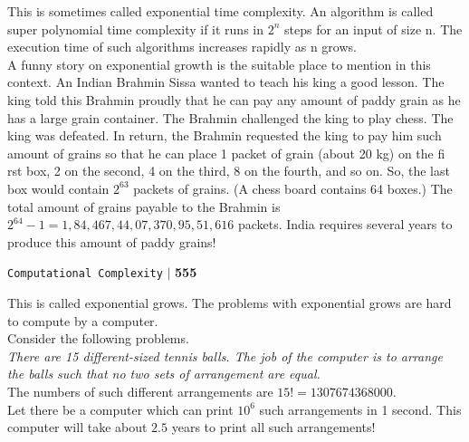 \documentclass[12pt]{article}
\begin{document}
\vspace*{0.2cm}
\small{
This is sometimes called exponential time complexity. An algorithm is called super polynomial time
complexity if it runs in $2^{n}$ steps for an input of size n. The execution time of such algorithms increases
rapidly as n grows.\\
\hspace*{0.5cm} A funny story on exponential growth is the suitable place to mention in this context. An Indian
Brahmin Sissa wanted to teach his king a good lesson. The king told this Brahmin proudly that he can
pay any amount of paddy grain as he has a large grain container. The Brahmin challenged the king to
play chess. The king was defeated. In return, the Brahmin requested the king to pay him such amount of
grains so that he can place 1 packet of grain (about 20 kg) on the fi rst box, 2 on the second, 4 on the third,
8 on the fourth, and so on. So, the last box would contain $2^{63}$ packets of grains. (A chess board contains
64 boxes.) The total amount of grains payable to the Brahmin is $2^{64} - 1 = 1, 84, 467, 44, 07, 370, 95, 51,
616$ packets. India requires several years to produce this amount of paddy grains!\\
}

\newpage
\begin{flushright}
 \texttt{Computational Complexity} \hspace*{0.10cm}\textbf{$|$} \textbf{555}\hspace*{0.5cm}
\end{flushright}

\vspace*{0.5cm}
\hspace*{0.5cm} This is called exponential grows. The problems with exponential grows are hard to compute by a
computer.\\
\hspace*{0.5cm} Consider the following problems.\\

\vspace*{0.2cm}
\emph{There are 15 different-sized tennis balls. The job of the computer is to arrange the balls such that no two
sets of arrangement are equal.}\\


\hspace*{0.5cm} The numbers of such different arrangements are $15! = 1307674368000$.\\
\hspace*{0.5cm} Let there be a computer which can print $10^{6}$ such arrangements in 1 second. This computer will take
about $2.5$ years to print all such arrangements!\\
\end{document}

